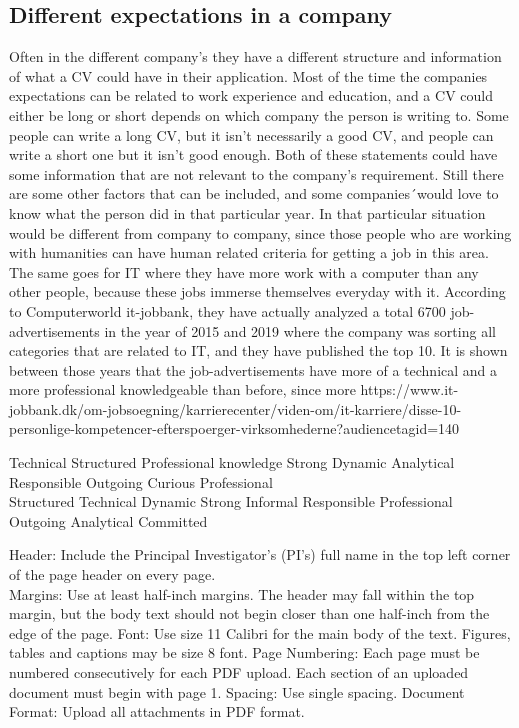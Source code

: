 \subsection{Different expectations in a company}
Often in the different company's they have a different structure and information of what a CV could have in their application.
Most of the time the companies expectations can be related to work experience and education,
and a CV could either be long or short depends on which company the person is writing to. Some people can write a long CV,
but it isn't necessarily a good CV, and people can write a short one but it isn't good enough. 
Both of these statements could have some information that are not relevant to the company's requirement. Still there are some other
factors that can be included, and some companies´would love to know what the person did in that particular year. 
In that particular situation would be different from company to company, since those people who are working with humanities 
can have human related criteria for getting a job in this area. The same goes for IT where they have more work with a computer
than any other people, because these jobs immerse themselves everyday with it. According to Computerworld it-jobbank, 
they have actually analyzed a total 6700 job-advertisements in the year of 2015 and 2019 where the company was sorting all categories
that are related to IT, and they have published the top 10. It is shown between those years that the job-advertisements
have more of a technical and a more professional knowledgeable than before, since more
https://www.it-jobbank.dk/om-jobsoegning/karrierecenter/viden-om/it-karriere/disse-10-personlige-kompetencer-efterspoerger-virksomhederne?audiencetagid=140

Technical
Structured
Professional knowledge
Strong
Dynamic
Analytical
Responsible
Outgoing
Curious
Professional \\

Structured
Technical
Dynamic
Strong
Informal
Responsible
Professional
Outgoing
Analytical
Committed

Header: Include the Principal Investigator’s (PI’s) full name in the top left corner of the page header on every page. \\
Margins: Use at least half-inch margins. The header may fall within the top margin, but the body text should not begin closer than one half-inch from the edge of the page.
Font: Use size 11 Calibri for the main body of the text. Figures, tables and captions may be size 8 font.
Page Numbering: Each page must be numbered consecutively for each PDF upload. Each section of an uploaded document must begin with page 1.
Spacing: Use single spacing.
Document Format: Upload all attachments in PDF format.